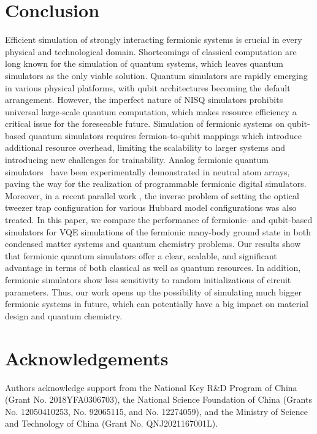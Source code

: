 \documentclass[aps, prx, reprint, superscriptaddress]{revtex4-2}
\begin{document}
\section{Conclusion}
\label{sec:conclusion}
Efficient simulation of strongly interacting fermionic systems is crucial in every physical and technological domain. Shortcomings of classical computation are long known for the simulation of quantum systems, which leaves quantum simulators as the only viable solution. Quantum simulators are rapidly emerging in various physical platforms, with qubit architectures becoming the default arrangement. However, the imperfect nature of NISQ simulators prohibits universal large-scale quantum computation, which makes resource efficiency a critical issue for the foreseeable future. Simulation of fermionic systems on qubit-based quantum simulators requires fermion-to-qubit mappings which introduce additional resource overhead, limiting the scalability to larger systems and introducing new challenges for trainability. 
Analog fermionic quantum simulators~\cite{spar2022realization,yan2022two} have been experimentally demonstrated in neutral atom arrays, paving the way for the realization of programmable fermionic digital simulators. Moreover, in a recent parallel work \cite{wei2023hubbard}, the inverse problem of setting the optical tweezer trap configuration for various Hubbard model configurations was also treated. In this paper, we compare the performance of fermionic- and qubit-based simulators for VQE simulations of the fermionic many-body ground state in both condensed matter systems and quantum chemistry problems. Our results show that fermionic quantum simulators offer a clear, scalable, and significant advantage in terms of both classical as well as quantum resources. In addition, fermionic simulators show less sensitivity to random initializations of circuit parameters. Thus, our work opens up the possibility of simulating much bigger fermionic systems in future, which can potentially have a big impact on material design and quantum chemistry.\\

  

\section*{Acknowledgements}
Authors acknowledge support from the National Key R\&D Program of China (Grant No. 2018YFA0306703), the National Science Foundation of
China (Grants No. 12050410253, No. 92065115, and No. 12274059), and the Ministry of Science and Technology of China (Grant No. QNJ2021167001L). 




 
\end{document}
